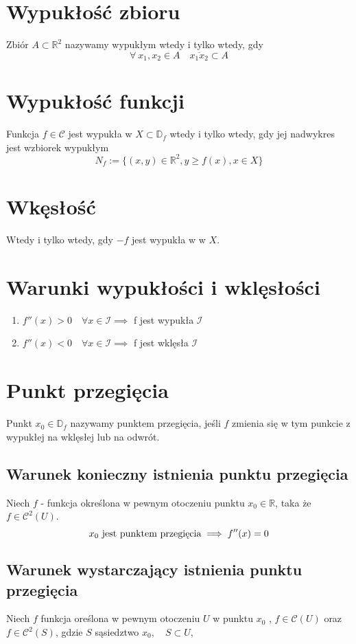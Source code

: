\documentclass[11pt]{article}
\begin{document}
\section{Wypukłość zbioru}
Zbiór $A \subset \mathbb{R}^2$ nazywamy wypukłym wtedy i tylko wtedy, gdy $$ \forall\ x_1,x_2 \in A \quad \overline{x_1x_2} \subset A$$
\section{Wypukłość funkcji}
Funkcja $f \in \mathcal{C}$ jest wypukła w $ X \subset \mathbb{D}_f$ wtedy i tylko wtedy, gdy jej nadwykres jest wzbiorek wypukłym $$ N_f := \{ (x,y) \in \mathbb{R}^2, y \geq f(x), x \in X\}$$
\section{Wkęsłość}
Wtedy i tylko wtedy, gdy $-f$ jest wypukła w w $X$.
\section{Warunki wypukłości i wklęsłości}
\begin{enumerate}
\item{$f''(x) > 0\quad \forall x \in \mathcal{I} \implies$ f jest wypukła $\mathcal{I}$}
\item{$f''(x) < 0\quad \forall x \in \mathcal{I} \implies$ f jest wklęsła $\mathcal{I}$}
 \end{enumerate}
 
 \section{Punkt przegięcia}
 Punkt $x_0 \in \mathbb{D}_f$ nazywamy punktem przegięcia, jeśli $f$ zmienia się w tym punkcie z wypukłej na wklęsłej lub na odwrót. 
 \subsection{Warunek konieczny istnienia punktu przegięcia}
Niech $f$ - funkcja określona w pewnym otoczeniu punktu $x_0 \in \mathbb{R}$, taka że $f \in \mathcal{C}^2(U)$.
$$ x_0 \hbox{ jest punktem przegięcia} \implies f''(x)=0$$
\subsection{Warunek wystarczający istnienia punktu przegięcia}
Niech $f$ funkcja oreślona w pewnym otoczeniu $U$ w punktu $x_0$ , $ f \in \mathcal{C}(U) $ oraz $f \in \mathcal{C}^2(S)$, gdzie $S$ sąsiedztwo $x_0,  \quad S \subset U$, 
\end{document}

